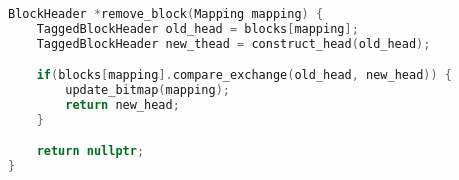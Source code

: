 \newpage

\begin{lstlisting}[language=C++, caption={Concurrent removal of the head of a free-list.}, label={algorithm:concurrent_remove_block}]
BlockHeader *remove_block(Mapping mapping) {
    TaggedBlockHeader old_head = blocks[mapping];
    TaggedBlockHeader new_thead = construct_head(old_head);

    if(blocks[mapping].compare_exchange(old_head, new_head)) {
        update_bitmap(mapping);
        return new_head;
    }

    return nullptr;
}
\end{lstlisting}

